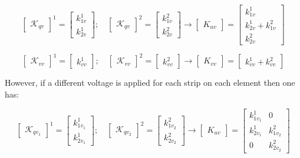 \documentclass{ifacconf}
\begin{document}
\begin{equation}
\begin{bmatrix}
\mathcal{K}_{qv}
\end{bmatrix}^1 = \begin{bmatrix}
k^1_{1v} \\  k^1_{2v}
\end{bmatrix}; \quad \begin{bmatrix}
\mathcal{K}_{qv}
\end{bmatrix}^2 = \begin{bmatrix}
k^2_{1v} \\  k^2_{2v}
\end{bmatrix} \rightarrow \begin{bmatrix}
K_{uv}
\end{bmatrix} = \begin{bmatrix}
k^1_{1v} \\  k^1_{2v}+ k^2_{1v}  \\ k^2_{2v} 
\end{bmatrix}
\end{equation}

\begin{equation}
\begin{bmatrix}
\mathcal{K}_{vv}
\end{bmatrix}^1 = \begin{bmatrix}
k^1_{vv} 
\end{bmatrix}; \quad \begin{bmatrix}
\mathcal{K}_{vv}
\end{bmatrix}^2 = \begin{bmatrix}
k^2_{vv}
\end{bmatrix} \rightarrow \begin{bmatrix}
K_{vv}
\end{bmatrix} = \begin{bmatrix}
  k^1_{vv}+ k^2_{vv} 
\end{bmatrix}
\end{equation}

However, if a different voltage is applied for each strip on each element then one has:

\begin{equation}
\begin{bmatrix}
\mathcal{K}_{qv_1}
\end{bmatrix}^1 = \begin{bmatrix}
k^1_{1v_1} \\  k^1_{2v_1}
\end{bmatrix}; \quad \begin{bmatrix}
\mathcal{K}_{qv_2}
\end{bmatrix}^2 = \begin{bmatrix}
k^2_{1v_2} \\  k^2_{2v_2}
\end{bmatrix} \rightarrow \begin{bmatrix}
K_{uv}
\end{bmatrix} = \begin{bmatrix}
k^1_{1v_1} & 0 \\   k^1_{2v_1} & k^2_{1v_2}  \\ 0 & k^2_{2v_2} 
\end{bmatrix}
\end{equation}
\end{document}
